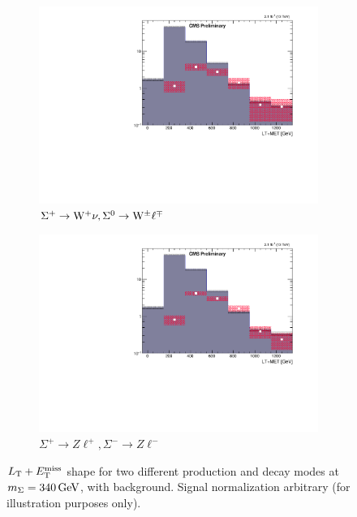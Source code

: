 \begin{figure}
\begin{center}
	\begin{subfigure}[b]{.7\textwidth}
		\includegraphics[width=\textwidth]{Strategy/LT+MET_tr+w+vltr0wl}
		\caption{$\Sigma^+ \to \mathrm{W}^+ \nu, \Sigma^0 \to \mathrm{W}^\pm \ell^\mp$}
	\end{subfigure}
	\begin{subfigure}[b]{.7\textwidth}
		\includegraphics[width=\textwidth]{Strategy/LT+MET_tr+zl+tr-zl-}
		\caption{$\Sigma^+ \to Z \ell^+, \Sigma^- \to Z \ell^-$}
	\end{subfigure}
	\caption{$L_\textrm{T} + E_{\mathrm{T}}^{\text{miss}}$ shape for two different production and decay modes at $m_\Sigma = 340\,\text{Ge\hspace{-.08em}V}$, with \WZ background. Signal normalization arbitrary (for illustration purposes only).
	\label{fig:Optimization2}}
\end{center}
\end{figure}

